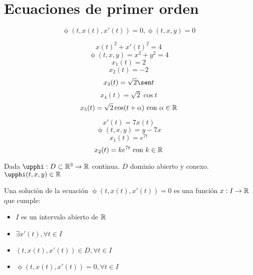 
\section{Ecuaciones de primer orden}
\[ \upphi(t, x(t), x'(t)) = 0,   \upphi(t,x,y) = 0  \]

\begin{ejemplo}
\[x(t)^2 + x'(t)^2 = 4 \]
\[ \upphi(t,x,y) = x^2+y^2 = 4\]
\[ x_1(t) = 2 \]
\[ x_2(t) = -2 \]
\[ x_3(t) = \sqrt{2}\sen t \]
\[ x_4(t) = \sqrt{2}\cos t \]
\[ x_5(t) = \sqrt{2}\cos(t+\alpha) \text{ con } \alpha\in\mathbb{R} \]
\end{ejemplo}

\begin{ejemplo}

\[ x'(t) = 7x(t) \]
\[ \upphi(t,x,y) = y - 7x \]
\[ x_1(t) = e^{7t} \]
\[ x_2(t) = ke^{7t} \text{ con } k \in \mathbb{R} \] 


\end{ejemplo}

Dada $\upphi: D\subset\R^3\to\R$ continua.
$D$ dominio abierto y conexo.
$\upphi(t,x,y)\in\R$

\begin{ndef}

Una solución de la ecuación $\upphi(t, x(t), x'(t)) = 0$ es una función $x:I\to\mathbb{R}$ que cumple:
\begin{itemize}
\item $I$ es un intervalo abierto de $\mathbb{R}$
\item $\exists x'(t), \forall t \in I$
\item $(t, x(t), x'(t)) \in D, \forall t \in I$
\item $\upphi(t,x(t),x'(t)) = 0, \forall t \in I$
\end{itemize}

\end{ndef}


